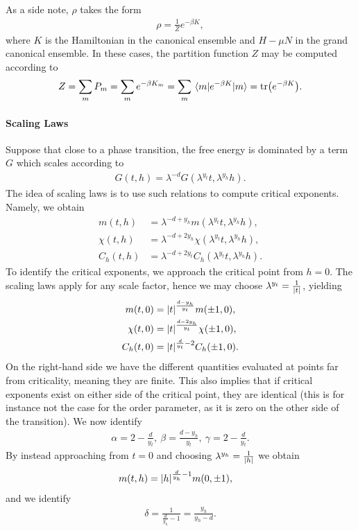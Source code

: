 As a side note, $\rho$ takes the form
\begin{align*}
	\rho = \frac{1}{Z}e^{-\beta K},
\end{align*}
where $K$ is the Hamiltonian in the canonical ensemble and $H - \mu N$ in the grand canonical ensemble. In these cases, the partition function $Z$ may be computed according to
\begin{align*}
	Z = \sum\limits_{m}P_{m} = \sum\limits_{m}e^{-\beta K_{m}} = \sum\limits_{m}\mel{m}{e^{-\beta K}}{m} = \tr(e^{-\beta K}).
\end{align*}

\paragraph{Scaling Laws}
Suppose that close to a phase transition, the free energy is dominated by a term $G$ which scales according to
\begin{align*}
	G(t, h) = \lambda^{-d}G(\lambda^{y_{t}}t, \lambda^{y_{h}}h).
\end{align*}
The idea of scaling laws is to use such relations to compute critical exponents. Namely, we obtain
\begin{align*}
	m(t, h)     &= \lambda^{-d + y_{h}}m(\lambda^{y_{t}}t, \lambda^{y_{h}}h), \\
	\chi(t, h)  &= \lambda^{-d + 2y_{h}}\chi(\lambda^{y_{t}}t, \lambda^{y_{h}}h), \\
	C_{h}(t, h) &= \lambda^{-d + 2y_{t}}C_{h}(\lambda^{y_{t}}t, \lambda^{y_{h}}h).
\end{align*}
To identify the critical exponents, we approach the critical point from $h = 0$. The scaling laws apply for any scale factor, hence we may choose $\lambda^{y_{t}} = \frac{1}{\abs{t}}$, yielding
\begin{align*}
	m(t, 0)     &= \abs{t}^{\frac{d - y_{h}}{y_{t}}}m(\pm 1, 0), \\
	\chi(t, 0)  &= \abs{t}^{\frac{d - 2y_{h}}{y_{t}}}\chi(\pm 1, 0), \\
	C_{h}(t, 0) &= \abs{t}^{\frac{d}{y_{t}} - 2}C_{h}(\pm 1, 0).
\end{align*}
On the right-hand side we have the different quantities evaluated at points far from criticality, meaning they are finite. This also implies that if critical exponents exist on either side of the critical point, they are identical (this is for instance not the case for the order parameter, as it is zero on the other side of the transition). We now identify
\begin{align*}
	\alpha = 2 - \frac{d}{y_{t}},\ \beta = \frac{d - y_{h}}{y_{t}},\ \gamma = 2 - \frac{d}{y_{t}}.
\end{align*}
By instead approaching from $t = 0$ and choosing $\lambda^{y_{h}} = \frac{1}{\abs{h}}$ we obtain
\begin{align*}
	m(t, h) &= \abs{h}^{\frac{d}{y_{h}} - 1}m(0, \pm 1),
\end{align*}
and we identify
\begin{align*}
	\delta= \frac{1}{\frac{d}{y_{h}} - 1} = \frac{y_{h}}{y_{h} - d}.
\end{align*}

